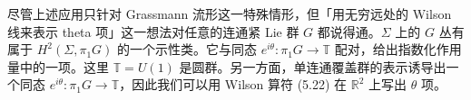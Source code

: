 
尽管上述应用只针对 Grassmann 流形这一特殊情形，但「用无穷远处的 Wilson 线来表示 theta 项」这一想法对任意的连通紧 Lie 群 $G$ 都说得通。$\Sigma$ 上的 $G$ 丛有属于 $H^2(\Sigma,\pi_1G)$ 的一个示性类。它与同态 $e^{i\theta}:\pi_1G\to\mathbb{T}$ 配对，给出指数化作用量中的一项。这里 $\mathbb{T}=U(1)$ 是圆群。另一方面，单连通覆盖群的表示诱导出一个同态 $e^{i\theta}:\pi_1G\to\mathbb{T}$，因此我们可以用 Wilson 算符 (5.22) 在 $\mathbb{R}^2$ 上写出 $\theta$ 项。
